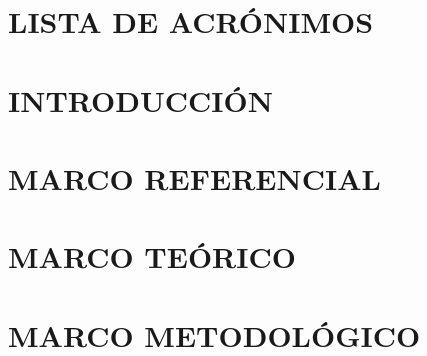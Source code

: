 \documentclass[letterpaper,titlepage,12pt,oneside,spanish,final]{report_eie}
\begin{document}
%
\thispagestyle{empty}%
\renewcommand{\baselinestretch}{1.5}%
\addtocounter{page}{3}%
\setlength{\parskip}{3pt}%

\tableofcontents%

\listoffigures%

\listoftables%


\chapter*{LISTA DE ACRÓNIMOS}%
%


\chapter*{INTRODUCCIÓN}\label{CAP:intro}
\setlength{\parskip}{14pt}%
%

%
%

\chapter{MARCO REFERENCIAL}\label{CAP:referencial}
%

\chapter{MARCO TEÓRICO}\label{CAP:marco_teor}
%

\chapter{MARCO METODOLÓGICO}\label{CAP:marco_met}
%
\end{document}
